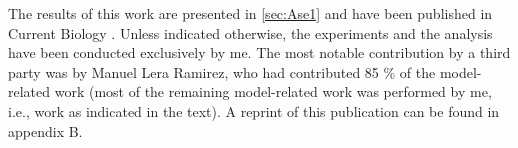 The results of this work are presented in \autoref{sec:Ase1} and have been published in Current Biology \parencite{Krattenmacher2024}. Unless indicated otherwise, the experiments and the analysis have been conducted exclusively by me. The most notable contribution by a third party was by Manuel Lera Ramirez, who had contributed 85 \% of the model-related work (most of the remaining model-related work was performed by me, i.e., work as indicated in the text). A reprint of this publication can be found in appendix B.